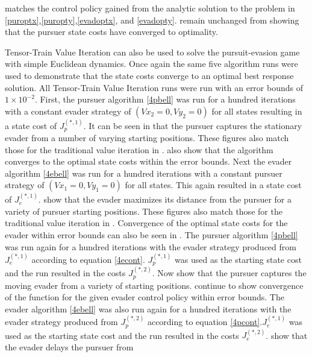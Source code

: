 matches the control policy gained from the analytic solution to the problem in \ref{puroptx},\ref{puropty},\ref{evadoptx}, and \ref{evadopty}.  remain unchanged from  showing that the pursuer state costs have converged to optimality.

Tensor-Train Value Iteration can also be used to solve the pursuit-evasion game with simple Euclidean dynamics. Once again the same five algorithm runs were used to demonstrate that the state costs converge to an optimal best response solution. All Tensor-Train Value Iteration runs were run with an error bounds of $1 \times 10^{-2}$. First, the pursuer algorithm \ref{4pbell} was run for a hundred iterations with a constant evader strategy of $(Vx_2 = 0,Vy_2 = 0)$ for all states resulting in a state cost of $J^{(*,1)}_p$. It can be seen in  that the pursuer captures the stationary evader from a number of varying starting positions. These figures also match those for the traditional value iteration in .  also show that the algorithm converges to the optimal state costs within the error bounds. Next the evader algorithm \ref{4ebell} was run for a hundred iterations with a constant pursuer strategy of $(Vx_1 = 0,Vy_1 = 0)$ for all states. This again resulted in a state cost of $J^{(*,1)}_e$.  show that the evader maximizes its distance from the pursuer for a variety of pursuer starting positions. These figures also match those for the traditional value iteration in . Convergence of the optimal state costs for the evader within error bounds can also be seen in . The pursuer algorithm \ref{4pbell} was run again for a hundred iterations with the evader strategy produced from $J^{(*,1)}_e$ according to equation \ref{4econt}. $J^{(*,1)}_p$ was used as the starting state cost and the run resulted in the costs $J^{(*,2)}_p$. Now  show that the pursuer captures the moving evader from a variety of starting positions.  continue to show convergence of the function for the given evader control policy within error bounds. The evader algorithm \ref{4ebell} was also run again for a hundred iterations with the evader strategy produced from $J^{(*,2)}_p$ according to equation \ref{4pcont}.$J^{(*,1)}_e$ was used as the starting state cost and the run resulted in the costs $J^{(*,2)}_e$.  show that the evader delays the pursuer from 